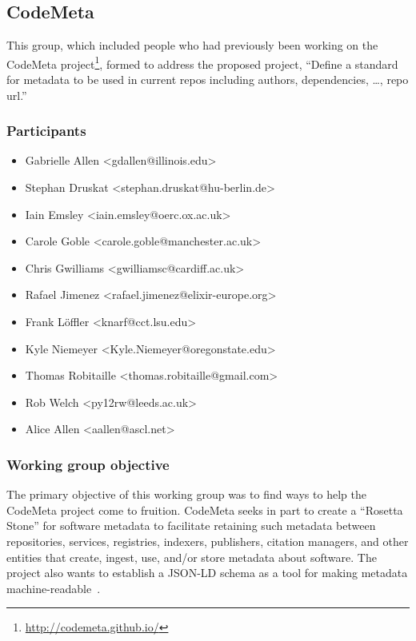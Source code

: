 \subsection{CodeMeta}
\label{sec:CodeMeta}


This group, which included people who had previously been working on the CodeMeta project\footnote{\url{http://codemeta.github.io/}}, formed to address the proposed project,
 ``Define a standard for metadata to be used in current repos including authors, dependencies, \dots{}, repo url.''

\subsubsection{Participants}

\begin{itemize}
\item Gabrielle Allen <gdallen@illinois.edu>
\item Stephan Druskat <stephan.druskat@hu-berlin.de>
\item Iain Emsley <iain.emsley@oerc.ox.ac.uk>
\item Carole Goble <carole.goble@manchester.ac.uk>
\item Chris Gwilliams <gwilliamsc@cardiff.ac.uk>
\item Rafael Jimenez <rafael.jimenez@elixir-europe.org>
\item Frank L\"{o}ffler <knarf@cct.lsu.edu>
\item Kyle Niemeyer <Kyle.Niemeyer@oregonstate.edu>
\item Thomas Robitaille <thomas.robitaille@gmail.com>
\item Rob Welch <py12rw@leeds.ac.uk>
\item Alice Allen <aallen@ascl.net>
\end{itemize}

\subsubsection{Working group objective}

The primary objective of this working group was to find ways to help the CodeMeta project come to fruition. CodeMeta seeks in part to create a ``Rosetta Stone'' for software metadata to facilitate retaining such metadata between repositories, services, registries, indexers, publishers, citation managers, and other entities that create, ingest, use, and/or store metadata about software. The project also wants to establish a JSON-LD schema as a tool for making metadata machine-readable~\cite{CodeMeta_schema}.

